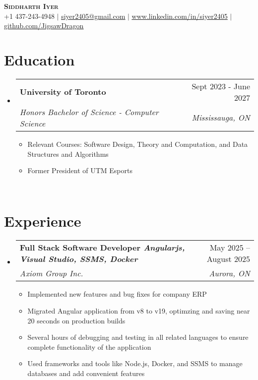 \documentclass[letterpaper,11pt]{article}
\makeatletter
\newcommand{\resumeItem}[1]{
  \item\small{
    {#1 \vspace{-2pt}}
  }
}
\newcommand{\resumeSubheading}[4]{
  \vspace{-2pt}\item
    \begin{tabular*}{0.97\textwidth}[t]{l@{\extracolsep{\fill}}r}
      \textbf{#1} & #2 \\
      \textit{\small#3} & \textit{\small #4} \\
    \end{tabular*}\vspace{-7pt}
}
\newcommand{\resumeSubHeadingListStart}{\begin{itemize}[leftmargin=0.15in, label={}]}
\newcommand{\resumeSubHeadingListEnd}{\end{itemize}}
\newcommand{\resumeItemListStart}{\begin{itemize}}
\newcommand{\resumeItemListEnd}{\end{itemize}\vspace{-5pt}}
\makeatother
\begin{document}

\begin{center}
    \textbf{\Huge \scshape Siddharth Iyer} \\ \vspace{1pt}
    \small +1 437-243-4948 $|$ \href{mailto:x@x.com}{\underline{siyer2405@gmail.com}} $|$ 
    \href{https://linkedin.com/in/...}{\underline{www.linkedin.com/in/siyer2405}} $|$
    \href{https://github.com/...}{\underline{github.com/JigsawDragon}}
\end{center}


\section{Education}
  \resumeSubHeadingListStart
    \resumeSubheading
      {University of Toronto}{Sept 2023 - June 2027}
      {Honors Bachelor of Science -  Computer Science}{Mississauga, ON}
    \resumeItemListStart
        \resumeItem{Relevant Courses: Software Design, Theory and Computation, and Data Structures and Algorithms}
        \resumeItem{Former President of UTM Esports}
    \resumeItemListEnd
    \resumeSubHeadingListEnd
\
\section{Experience}
\resumeSubHeadingListStart
    \resumeSubheading
      {Full Stack Software Developer \textnormal{\emph{Angularjs, Visual Studio, SSMS, Docker}}}{ May 2025 -- August 2025}
      {Axiom Group Inc.}{Aurora, ON}
      \resumeItemListStart
        \resumeItem{Implemented new features and bug fixes for company ERP}
        \resumeItem{Migrated Angular application from v8 to v19, optimzing and saving near 20 seconds on production builds}
        \resumeItem{Several hours of debugging and testing in all related languages to ensure complete functionality of the application}
        \resumeItem{Used frameworks and tools like Node.js, Docker, and SSMS to manage databases and add convenient features}
      \resumeItemListEnd
  \resumeSubHeadingListEnd
    
\end{document}
